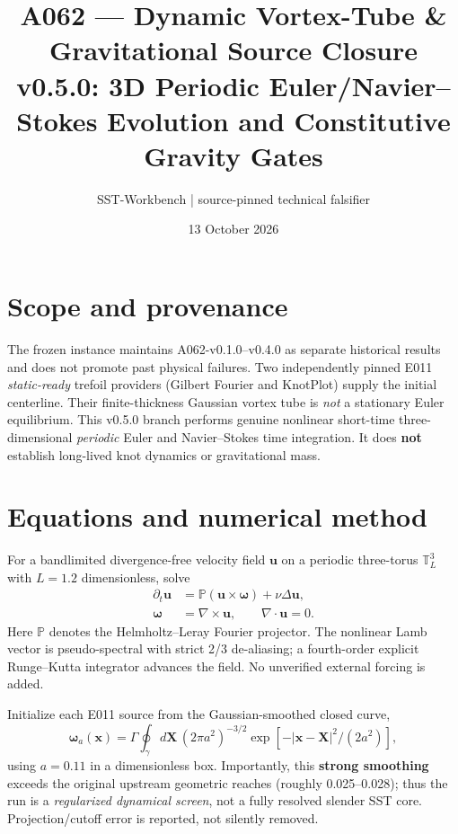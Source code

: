 \documentclass[10pt,a4paper]{article}
\title{A062 --- Dynamic Vortex-Tube \& Gravitational Source Closure\\
\large v0.5.0: 3D Periodic Euler/Navier--Stokes Evolution and Constitutive Gravity Gates}
\author{SST-Workbench | source-pinned technical falsifier}
\date{13 October 2026}
\begin{document}
\maketitle
\section{Scope and provenance}
The frozen instance maintains A062-v0.1.0--v0.4.0 as separate historical results and does not promote past physical failures. Two independently pinned E011 \emph{static-ready} trefoil providers (Gilbert Fourier and KnotPlot) supply the initial centerline. Their finite-thickness Gaussian vortex tube is \emph{not} a stationary Euler equilibrium. This v0.5.0 branch performs genuine nonlinear short-time three-dimensional \emph{periodic} Euler and Navier--Stokes time integration. It does \textbf{not} establish long-lived knot dynamics or gravitational mass.
\section{Equations and numerical method}
For a bandlimited divergence-free velocity field $\mathbf u$ on a periodic three-torus $\mathbb T^3_L$ with $L=1.2$ dimensionless, solve
\begin{align}
\partial_t\mathbf u &=\mathbb P(\mathbf u\times\boldsymbol\omega)+\nu\Delta\mathbf u,\\
\boldsymbol\omega &= \nabla\times\mathbf u,\qquad\nabla\cdot\mathbf u=0.
\end{align}
Here $\mathbb P$ denotes the Helmholtz--Leray Fourier projector. The nonlinear Lamb vector is pseudo-spectral with strict 2/3 de-aliasing; a fourth-order explicit Runge--Kutta integrator advances the field. No unverified external forcing is added.

Initialize each E011 source from the Gaussian-smoothed closed curve,
\begin{equation}
\boldsymbol\omega_a(\mathbf x)=\Gamma\oint_\gamma d\mathbf X\,
(2\pi a^2)^{-3/2}\exp[-|\mathbf x-\mathbf X|^2/(2a^2)],
\end{equation}
using $a=0.11$ in a dimensionless box. Importantly, this \textbf{strong smoothing} exceeds the original upstream geometric reaches (roughly 0.025--0.028); thus the run is a \emph{regularized dynamical screen}, not a fully resolved slender SST core. Projection/cutoff error is reported, not silently removed.
\end{document}

